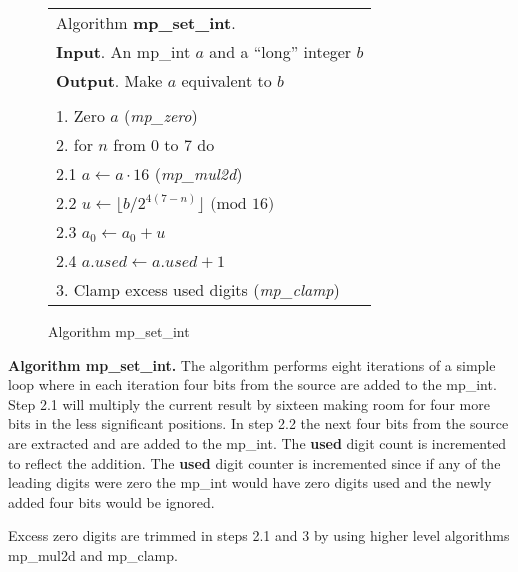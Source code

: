 \documentclass[b5paper]{book}
\begin{document}
\begin{figure}[here]
\begin{center}
\begin{tabular}{l}
\hline Algorithm \textbf{mp\_set\_int}. \\
\textbf{Input}.   An mp\_int $a$ and a ``long'' integer $b$ \\
\textbf{Output}.  Make $a$ equivalent to $b$ \\
\hline \\
1.  Zero $a$ (\textit{mp\_zero}) \\
2.  for $n$ from 0 to 7 do \\
\hspace{3mm}2.1  $a \leftarrow a \cdot 16$ (\textit{mp\_mul2d}) \\
\hspace{3mm}2.2  $u \leftarrow \lfloor b / 2^{4(7 - n)} \rfloor \mbox{ (mod }16\mbox{)}$\\
\hspace{3mm}2.3  $a_0 \leftarrow a_0 + u$ \\
\hspace{3mm}2.4  $a.used \leftarrow a.used + 1$ \\
3.  Clamp excess used digits (\textit{mp\_clamp}) \\
\hline
\end{tabular}
\end{center}
\caption{Algorithm mp\_set\_int}
\end{figure}

\textbf{Algorithm mp\_set\_int.}
The algorithm performs eight iterations of a simple loop where in each iteration four bits from the source are added to the 
mp\_int.  Step 2.1 will multiply the current result by sixteen making room for four more bits in the less significant positions.  In step 2.2 the
next four bits from the source are extracted and are added to the mp\_int. The \textbf{used} digit count is 
incremented to reflect the addition.  The \textbf{used} digit counter is incremented since if any of the leading digits were zero the mp\_int would have
zero digits used and the newly added four bits would be ignored.

Excess zero digits are trimmed in steps 2.1 and 3 by using higher level algorithms mp\_mul2d and mp\_clamp.
\end{document}
